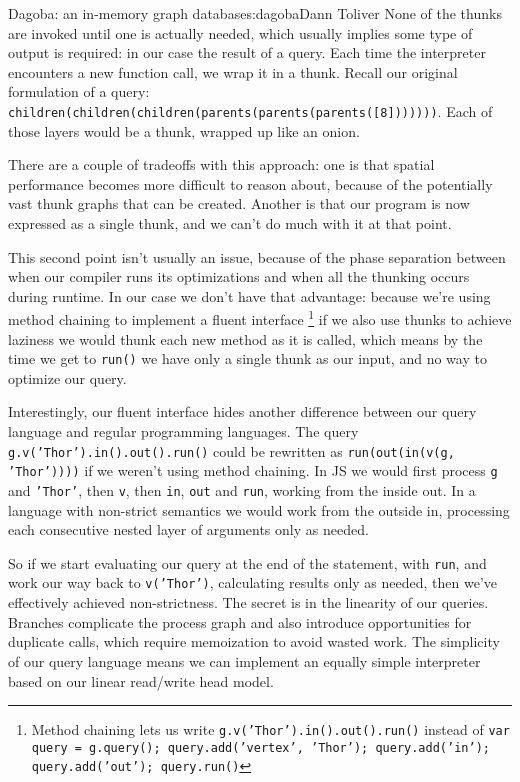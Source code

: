 \begin{aosachapter}{Dagoba: an in-memory graph database}{s:dagoba}{Dann Toliver}
None of the thunks are invoked until one is actually needed, which
usually implies some type of output is required: in our case the result
of a query. Each time the interpreter encounters a new function call, we
wrap it in a thunk. Recall our original formulation of a query:
\texttt{children(children(children(parents(parents(parents({[}8{]}))))))}.
Each of those layers would be a thunk, wrapped up like an onion.

There are a couple of tradeoffs with this approach: one is that spatial
performance becomes more difficult to reason about, because of the
potentially vast thunk graphs that can be created. Another is that our
program is now expressed as a single thunk, and we can't do much with it
at that point.

This second point isn't usually an issue, because of the phase
separation between when our compiler runs its optimizations and when all
the thunking occurs during runtime. In our case we don't have that
advantage: because we're using method chaining to implement a fluent
interface \footnote{Method chaining lets us write
  \texttt{g.v('Thor').in().out().run()} instead of
  \texttt{var query = g.query(); query.add('vertex', 'Thor'); query.add('in'); query.add('out'); query.run()}}
if we also use thunks to achieve laziness we would thunk each new method
as it is called, which means by the time we get to \texttt{run()} we
have only a single thunk as our input, and no way to optimize our query.

Interestingly, our fluent interface hides another difference between our
query language and regular programming languages. The query
\texttt{g.v('Thor').in().out().run()} could be rewritten as
\texttt{run(out(in(v(g, 'Thor'))))} if we weren't using method chaining.
In JS we would first process \texttt{g} and \texttt{'Thor'}, then
\texttt{v}, then \texttt{in}, \texttt{out} and \texttt{run}, working
from the inside out. In a language with non-strict semantics we would
work from the outside in, processing each consecutive nested layer of
arguments only as needed.

So if we start evaluating our query at the end of the statement, with
\texttt{run}, and work our way back to \texttt{v('Thor')}, calculating
results only as needed, then we've effectively achieved non-strictness.
The secret is in the linearity of our queries. Branches complicate the
process graph and also introduce opportunities for duplicate calls,
which require memoization to avoid wasted work. The simplicity of our
query language means we can implement an equally simple interpreter
based on our linear read/write head model.


\end{aosachapter}
